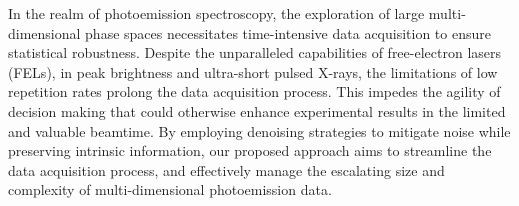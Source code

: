 
In the realm of photoemission spectroscopy, the exploration of large multi-dimensional phase spaces necessitates time-intensive data acquisition to ensure statistical robustness. Despite the unparalleled capabilities of free-electron lasers (FELs), in peak brightness and ultra-short pulsed X-rays, the limitations of low repetition rates prolong the data acquisition process. This impedes the agility of decision making that could otherwise enhance experimental results in the limited and valuable beamtime. By employing denoising strategies to mitigate noise while preserving intrinsic information, our proposed approach aims to streamline the data acquisition process, and effectively manage the escalating size and complexity of multi-dimensional photoemission data.

